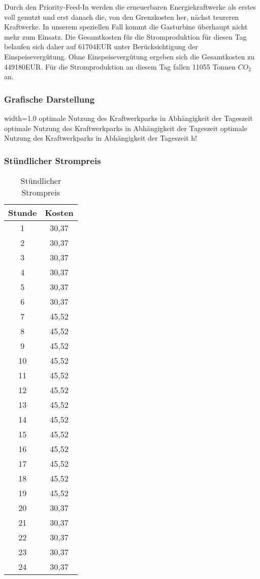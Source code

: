 \documentclass{eegreport}
\begin{document}
Durch den Priority-Feed-In werden die erneuerbaren Energiekraftwerke als erstes voll genutzt und erst danach die, von den Grenzkosten her, nächst teureren Kraftwerke. In unserem speziellen Fall kommt die Gasturbine überhaupt nicht mehr zum Einsatz.
Die Gesamtkosten für die Stromproduktion für diesen Tag belaufen sich daher auf 61704EUR unter Berücksichtigung der Einspeisevergütung. 
Ohne Einspeisevergütung ergeben sich die Gesamtkosten zu 449180EUR.
Für die Stromproduktion an diesem Tag fallen 11055 Tonnen $CO_2$ an.


\newpage
\subsubsection{Grafische Darstellung}

       {width=1.0\textwidth}
       {optimale Nutzung des Kraftwerkparks in Abhängigkeit der Tageszeit}
       {optimale Nutzung des Kraftwerkparks in Abhängigkeit der Tageszeit}
       {optimale Nutzung des Kraftwerkparks in Abhängigkeit der Tageszeit}
       {h!} 

\newpage
\subsubsection{Stündlicher Strompreis}
\begin{table}[h]
\begin{center}
\begin{tabular}{|c|c|}
\hline 
\textbf{Stunde} & \textbf{Kosten} \\ 
\hline 
1 & 30,37 \\ 
\hline 
2 & 30,37 \\ 
\hline 
3 & 30,37 \\ 
\hline 
4 & 30,37 \\ 
\hline 
5 & 30,37 \\ 
\hline 
6 & 30,37 \\ 
\hline 
7 & 45,52 \\ 
\hline 
8 & 45,52 \\ 
\hline 
9 & 45,52 \\ 
\hline 
10 & 45,52 \\ 
\hline 
11 & 45,52 \\ 
\hline 
12 & 45,52 \\ 
\hline 
13 & 45,52 \\ 
\hline 
14 & 45,52 \\ 
\hline 
15 & 45,52 \\ 
\hline 
16 & 45,52 \\ 
\hline 
17 & 45,52 \\ 
\hline 
18 & 45,52 \\ 
\hline 
19 & 45,52 \\ 
\hline 
20 & 30,37 \\ 
\hline 
21 & 30,37 \\ 
\hline 
22 & 30,37 \\ 
\hline 
23 & 30,37 \\ 
\hline 
24 & 30,37 \\ 
\hline 
\end{tabular} 
\end{center}
\caption{Stündlicher Strompreis}
\label{ab}
\end{table}
\end{document}
